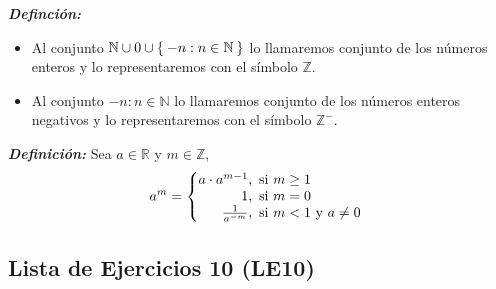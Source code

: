 \documentclass[11pt]{article}
\newcommand{\N}{\mathbb{N}}
\newcommand{\Z}{\mathbb{Z}}
\newcommand{\R}{\mathbb{R}}
\newcommand{\bfit}[1]{\textbf{\textit{#1}}}
\let\set\Set
\begin{document}
  \bfit{Definción:} \begin{itemize}
    \item Al conjunto $\N \cup {0} \cup \set{-n: n\in \N}$ lo llamaremos conjunto de los números enteros y lo representaremos con el símbolo $\Z$.
    \item Al conjunto ${-n: n\in \N}$ lo llamaremos conjunto de los números enteros negativos y lo representaremos con el símbolo $\Z^-$.
   \end{itemize}
   

   \bfit{Definición:}  Sea $a\in \R$ y $m\in \Z$,
 \[
  a^m = \left\{
 \begin{array}{@{}r@{\thinspace}l}
  a\cdot a^{m-1}, &  \ \text{si}  \ m \geq 1\\
  1, &  \ \text{si}  \ m = 0\\
  \frac{1}{a^{-m}}, &  \ \text{si}  \ m < 1 \ \text{y} \ a\neq 0
 \end{array} \right. \]

 \subsection*{Lista de Ejercicios 10 (LE10)}
\end{document}
